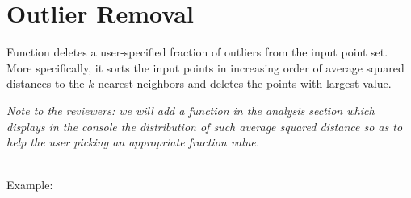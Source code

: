 \section{Outlier Removal}

Function  deletes a user-specified fraction of outliers from the input point set. More specifically, it sorts the input points in increasing order of average squared distances to the $k$ nearest neighbors and deletes the points with largest value.

\emph{Note to the reviewers: we will add a function in the analysis section which displays in the console the distribution of such average squared distance so as to help the user picking an appropriate fraction value.}

  \\


Example:

